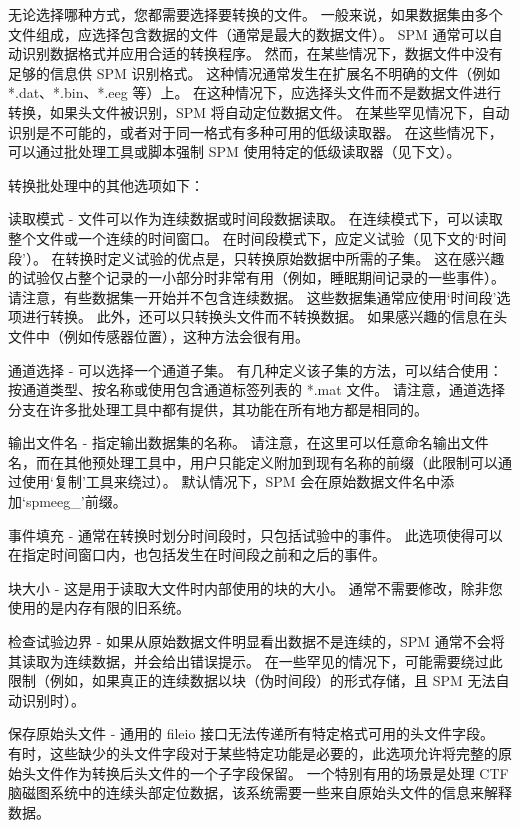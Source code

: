 无论选择哪种方式，您都需要选择要转换的文件。
一般来说，如果数据集由多个文件组成，应选择包含数据的文件（通常是最大的数据文件）。
SPM 通常可以自动识别数据格式并应用合适的转换程序。
然而，在某些情况下，数据文件中没有足够的信息供 SPM 识别格式。
这种情况通常发生在扩展名不明确的文件（例如 *.dat、*.bin、*.eeg 等）上。
在这种情况下，应选择头文件而不是数据文件进行转换，如果头文件被识别，SPM 将自动定位数据文件。
在某些罕见情况下，自动识别是不可能的，或者对于同一格式有多种可用的低级读取器。
在这些情况下，可以通过批处理工具或脚本强制 SPM 使用特定的低级读取器（见下文）。
 
转换批处理中的其他选项如下：
 
 
读取模式 - 文件可以作为连续数据或时间段数据读取。
在连续模式下，可以读取整个文件或一个连续的时间窗口。
在时间段模式下，应定义试验（见下文的‘时间段’）。
在转换时定义试验的优点是，只转换原始数据中所需的子集。
这在感兴趣的试验仅占整个记录的一小部分时非常有用（例如，睡眠期间记录的一些事件）。
请注意，有些数据集一开始并不包含连续数据。
这些数据集通常应使用‘时间段’选项进行转换。
此外，还可以只转换头文件而不转换数据。
如果感兴趣的信息在头文件中（例如传感器位置），这种方法会很有用。
 
 
通道选择 - 可以选择一个通道子集。
有几种定义该子集的方法，可以结合使用：按通道类型、按名称或使用包含通道标签列表的 *.mat 文件。
请注意，通道选择分支在许多批处理工具中都有提供，其功能在所有地方都是相同的。
 
 
输出文件名 - 指定输出数据集的名称。
请注意，在这里可以任意命名输出文件名，而在其他预处理工具中，用户只能定义附加到现有名称的前缀（此限制可以通过使用‘复制’工具来绕过）。
默认情况下，SPM 会在原始数据文件名中添加‘spmeeg\_’前缀。


事件填充 - 通常在转换时划分时间段时，只包括试验中的事件。
此选项使得可以在指定时间窗口内，也包括发生在时间段之前和之后的事件。


块大小 - 这是用于读取大文件时内部使用的块的大小。
通常不需要修改，除非您使用的是内存有限的旧系统。


检查试验边界 - 如果从原始数据文件明显看出数据不是连续的，SPM 通常不会将其读取为连续数据，并会给出错误提示。
在一些罕见的情况下，可能需要绕过此限制（例如，如果真正的连续数据以块（伪时间段）的形式存储，且 SPM 无法自动识别时）。


保存原始头文件 - 通用的 fileio 接口无法传递所有特定格式可用的头文件字段。
有时，这些缺少的头文件字段对于某些特定功能是必要的，此选项允许将完整的原始头文件作为转换后头文件的一个子字段保留。
一个特别有用的场景是处理 CTF 脑磁图系统中的连续头部定位数据，该系统需要一些来自原始头文件的信息来解释数据。


